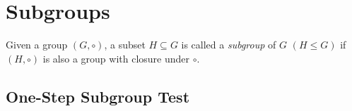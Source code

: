 \documentclass{article}
\begin{document}
\section{Subgroups}

Given a group \((G, \circ)\), a subset \(H \subseteq G\) is called a \textit{subgroup}
of \(G\) \((H\leq G)\) if \((H,\circ)\) is also a group with closure under \(\circ\).

\subsection{One-Step Subgroup Test}


\end{document}
